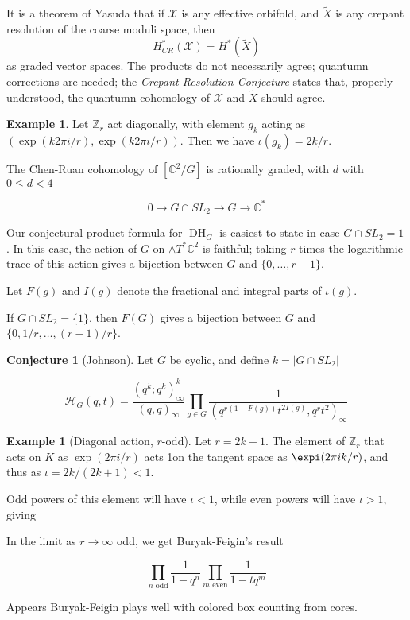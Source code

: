 \documentclass{amsart}[12pt]
\theoremstyle{definition}
\newtheorem{example}[dummy]{Example}
\newtheorem{conjecture}[dummy]{Conjecture}
\newcommand{\Z}{\mathbb{Z}}
\newcommand{\C}{\mathbb{C}}
\DeclareMathOperator{\DC}{DH}
\begin{document}
It is a theorem of Yasuda that if $\mathcal{X}$ is any effective orbifold, and $\widetilde{X}$ is any crepant resolution of the coarse moduli space, then 
$$H_{CR}^*(\mathcal{X})=H^*(\widetilde{X})$$
as graded vector spaces.  The products do not necessarily agree; quantumn corrections are needed; the \emph{Crepant Resolution Conjecture} states that, properly understood, the quantumn cohomology of $\mathcal{X}$ and $\widetilde{X}$ should agree.


\begin{example}
Let $\Z_r$ act diagonally, with element $g_k$ acting as $(\exp(k2\pi i/r),\exp(k2\pi i/r))$.  Then we have $\iota(g_k)=2k/r$.
\end{example}




The Chen-Ruan cohomology of $[\C^2/G]$ is rationally graded, with $d$ with $0\leq d < 4$


$$0\to G\cap SL_2\to G \to \C^*$$








Our conjectural product formula for $\DC_G$ is easiest to state in case $G\cap SL_2=1$.  In this case, the action of $G$ on $\wedge T^*\C^2$ is faithful; taking $r$ times the logarithmic trace of this action gives a bijection between $G$ and $\{0,\dots, r-1\}$.


Let $F(g)$ and $I(g)$ denote the fractional and integral parts of $\iota(g)$. 

If $G\cap SL_2=\{1\}$, then $F(G)$ gives a bijection between $G$ and $\{0, 1/r,\dots, (r-1)/r\}$.
\begin{conjecture}[Johnson]
Let $G$ be cyclic, and define $k=|G\cap SL_2|$

$$\mathcal{H}_G(q,t)= \frac{(q^k;q^k)^k_\infty}{(q,q)_\infty} \prod_{g\in G}\frac{1}{(q^{r(1-F(g))} t^{2I(g)},q^rt^2)_\infty}$$

\end{conjecture}


\begin{example}[Diagonal action, $r$-odd]
Let $r=2k+1$.   The element of $\Z_r$ that acts on $K$ as $\exp(2\pi i/r)$ acts 1on the tangent space as $\expi(2\pi i k/r)$, and thus as $\iota=2k/(2k+1)<1$.  

Odd powers of this element will have $\iota<1$, while even powers will have $\iota>1$, giving 

In the limit as $r\to\infty$ odd, we get Buryak-Feigin's result

$$\prod_{n \text{ odd}} \frac{1}{1-q^n}\prod_{m \text{ even}}\frac{1}{1-tq^m}$$
\end{example}
Appears Buryak-Feigin plays well with colored box counting from cores.
\end{document}
